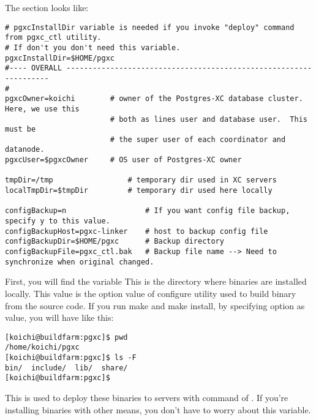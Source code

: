   The section looks like:
  
  \begin{lstlisting}[frame=single]
# pgxcInstallDir variable is needed if you invoke "deploy" command from pgxc_ctl utility.
# If don't you don't need this variable.
pgxcInstallDir=$HOME/pgxc
#---- OVERALL ------------------------------------------------------------------
#
pgxcOwner=koichi        # owner of the Postgres-XC database cluster.  Here, we use this
                        # both as lines user and database user.  This must be
                        # the super user of each coordinator and datanode.
pgxcUser=$pgxcOwner     # OS user of Postgres-XC owner

tmpDir=/tmp                 # temporary dir used in XC servers
localTmpDir=$tmpDir         # temporary dir used here locally

configBackup=n                  # If you want config file backup, specify y to this value.
configBackupHost=pgxc-linker    # host to backup config file
configBackupDir=$HOME/pgxc      # Backup directory
configBackupFile=pgxc_ctl.bak   # Backup file name --> Need to synchronize when original changed.
  \end{lstlisting}
  
  
      First, you will find the variable 
      This is the directory where \XC{} binaries are installed locally.
      This value is the  option value of configure utility used to build
	  \XC{} binary from the source code.
      If you run make and make install, by specifying  option as
	   value, you will have  like this:
      
      \begin{lstlisting}[frame=single]
[koichi@buildfarm:pgxc]$ pwd
/home/koichi/pgxc
[koichi@buildfarm:pgxc]$ ls -F
bin/  include/  lib/  share/
[koichi@buildfarm:pgxc]$
      \end{lstlisting}
      
      This is used to deploy these binaries to servers with  command of .
      If you're installing binaries with other means, you don't have to worry about this variable.

